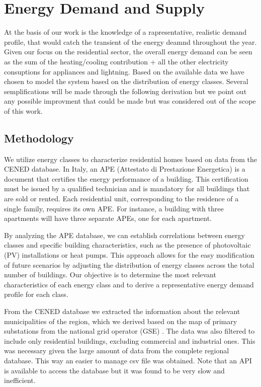 \section{Energy Demand and Supply}
At the basis of our work is the knowledge of a rapresentative, realistic demand profile, that would catch the transient of the energy deamnd throughout the year.
Given our focus on the residential sector, the overall energy demand can be seen as the sum of the heating/cooling contribution + all the other electricity consuptions for appliances and lightning.
Based on the available data we have chosen to model the system based on the distribution of energy classes.
Several semplifications will be made through the following derivation but we point out any possible improvment that could be made but was considered out of the scope of this work.

\subsection{Methodology}
We utilize energy classes to characterize residential homes based on data from the CENED database. 
In Italy, an APE (Attestato di Prestazione Energetica) is a document that certifies the energy performance of a building. 
This certification must be issued by a qualified technician and is mandatory for all buildings that are sold or rented. 
Each residential unit, corresponding to the residence of a single family, requires its own APE. 
For instance, a building with three apartments will have three separate APEs, one for each apartment.

By analyzing the APE database, we can establish correlations between energy classes and specific building characteristics, 
such as the presence of photovoltaic (PV) installations or heat pumps. 
This approach allows for the easy modification of future scenarios by adjusting the distribution of 
energy classes across the total number of buildings. 
Our objective is to determine the most relevant characteristics of each energy class and to derive 
a representative energy demand profile for each class.

From the CENED database \cite{cened2025} we extracted the information about the relevant municipalities of the region,
which we derived based on the map of primary substations from the national grid operator (GSE) \cite{gse_cabine_primarie}.
The data was also filtered to include only residential buildings, excluding commercial and industrial ones.
This was necessary given the large amount of data from the complete regional database. This way an easier to manage csv file was obtained.
Note that an API is available to access the database but it was found to be very slow and inefficient.

